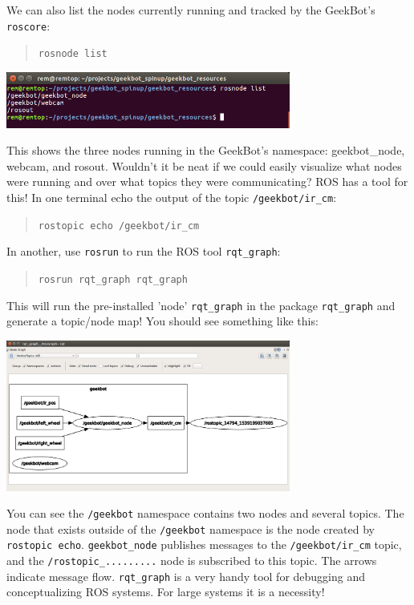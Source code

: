 We can also list the nodes currently running and tracked by the
GeekBot's \texttt{roscore}:

\begin{quote}
\texttt{rosnode\ list}
\end{quote}

\includegraphics[width=0.7\textwidth,height=\textheight]{figures/geekbot/repo_usage/rosnode_list.png}

This shows the three nodes running in the GeekBot's namespace:
geekbot\_node, webcam, and rosout. Wouldn't it be neat if we could
easily visualize what nodes were running and over what topics they were
communicating? ROS has a tool for this! In one terminal echo the output
of the topic \texttt{/geekbot/ir\_cm}:

\begin{quote}
\texttt{rostopic\ echo\ /geekbot/ir\_cm}
\end{quote}

In another, use \texttt{rosrun} to run the ROS tool \texttt{rqt\_graph}:

\begin{quote}
\texttt{rosrun\ rqt\_graph\ rqt\_graph}
\end{quote}

This will run the pre-installed 'node' \texttt{rqt\_graph} in the
package \texttt{rqt\_graph} and generate a topic/node map! You should
see something like this:

\includegraphics[width=0.7\textwidth,height=\textheight]{figures/geekbot/repo_usage/rqt_graph.png}

You can see the \texttt{/geekbot} namespace contains two nodes and
several topics. The node that exists outside of the \texttt{/geekbot}
namespace is the node created by \texttt{rostopic\ echo}.
\texttt{geekbot\_node} publishes messages to the
\texttt{/geekbot/ir\_cm} topic, and the \texttt{/rostopic\_.........}
node is subscribed to this topic. The arrows indicate message flow.
\texttt{rqt\_graph} is a very handy tool for debugging and
conceptualizing ROS systems. For large systems it is a necessity!

